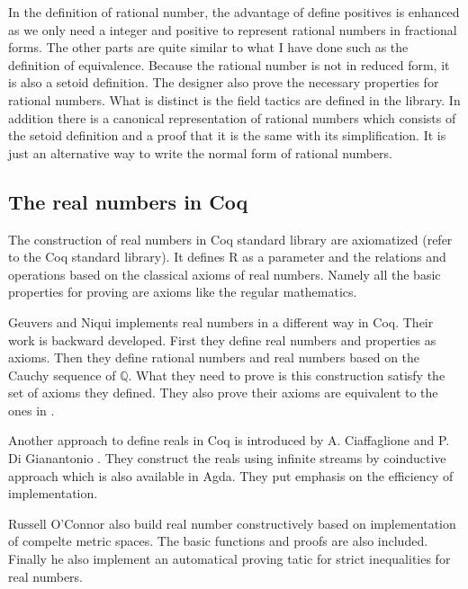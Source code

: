 \documentclass{article}
\theoremstyle{definition}
\begin{document}
In the definition of rational number, the advantage of define positives is enhanced as we only need a integer and positive to represent rational numbers in fractional forms. The other parts are quite similar to what I have done such as the definition of equivalence. Because the rational number is not in reduced form, it is also a setoid definition. The designer also prove the necessary properties for rational numbers. What is distinct is the field tactics are defined in the library. In addition there is a canonical representation of rational numbers which consists of the setoid definition and a proof that it is the same with its simplification. It is just an alternative way to write the normal form of rational numbers.


\subsection{The real numbers in Coq}
The construction of real numbers in Coq standard library are axiomatized (refer to the Coq standard library). It defines R as a parameter and the relations and operations based on the classical axioms of real numbers. Namely all the basic properties for proving are axioms like the regular mathematics.

Geuvers and Niqui \cite{CRC} implements real numbers in a different way in Coq. Their work is backward developed. First they define real numbers and properties as axioms. Then they define rational numbers and real numbers based on the Cauchy sequence of $\mathds{Q}$. What they need to prove is this construction satisfy the set of axioms they defined. They also prove their axioms are equivalent to the ones in \cite{Bridges199995}.

Another approach to define reals in Coq is introduced by A. Ciaffaglione and P. Di Gianantonio \cite{Ciaffaglione200639}. They construct the reals using infinite streams by coinductive approach which is also available in Agda. They put emphasis on the efficiency of implementation. 

Russell O’Connor \cite{oconnor} also build real number constructively based on implementation of compelte metric spaces. The basic functions and proofs are also included. Finally he also implement an automatical proving tatic for strict inequalities for real numbers.
\end{document}
